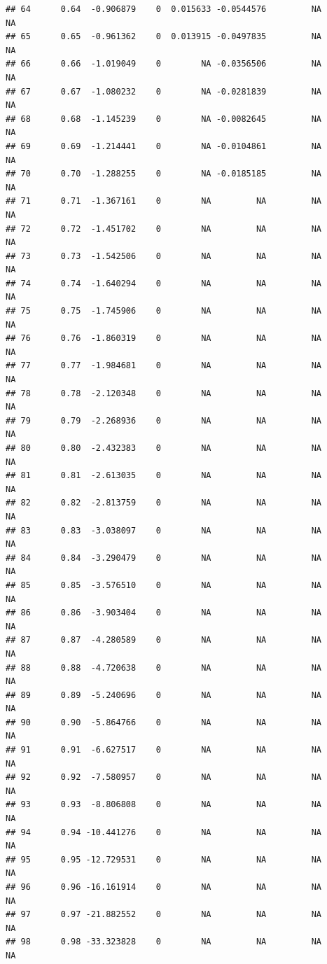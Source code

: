 \documentclass{article}\usepackage[]{graphicx}\usepackage[]{color}
\makeatletter
\newenvironment{kframe}{%
 \def\at@end@of@kframe{}%
 \ifinner\ifhmode%
  \def\at@end@of@kframe{\end{minipage}}%
  \begin{minipage}{\columnwidth}%
 \fi\fi%
 \def\FrameCommand##1{\hskip\@totalleftmargin \hskip-\fboxsep
 \colorbox{shadecolor}{##1}\hskip-\fboxsep
     \hskip-\linewidth \hskip-\@totalleftmargin \hskip\columnwidth}%
 \MakeFramed {\advance\hsize-\width
   \@totalleftmargin\z@ \linewidth\hsize
   \@setminipage}}%
 {\par\unskip\endMakeFramed%
 \at@end@of@kframe}
\newenvironment{knitrout}{}{} %
\makeatother
\begin{document}
\begin{knitrout}
\begin{kframe}
\begin{verbatim}
## 64      0.64  -0.906879    0  0.015633 -0.0544576         NA          NA
## 65      0.65  -0.961362    0  0.013915 -0.0497835         NA          NA
## 66      0.66  -1.019049    0        NA -0.0356506         NA          NA
## 67      0.67  -1.080232    0        NA -0.0281839         NA          NA
## 68      0.68  -1.145239    0        NA -0.0082645         NA          NA
## 69      0.69  -1.214441    0        NA -0.0104861         NA          NA
## 70      0.70  -1.288255    0        NA -0.0185185         NA          NA
## 71      0.71  -1.367161    0        NA         NA         NA          NA
## 72      0.72  -1.451702    0        NA         NA         NA          NA
## 73      0.73  -1.542506    0        NA         NA         NA          NA
## 74      0.74  -1.640294    0        NA         NA         NA          NA
## 75      0.75  -1.745906    0        NA         NA         NA          NA
## 76      0.76  -1.860319    0        NA         NA         NA          NA
## 77      0.77  -1.984681    0        NA         NA         NA          NA
## 78      0.78  -2.120348    0        NA         NA         NA          NA
## 79      0.79  -2.268936    0        NA         NA         NA          NA
## 80      0.80  -2.432383    0        NA         NA         NA          NA
## 81      0.81  -2.613035    0        NA         NA         NA          NA
## 82      0.82  -2.813759    0        NA         NA         NA          NA
## 83      0.83  -3.038097    0        NA         NA         NA          NA
## 84      0.84  -3.290479    0        NA         NA         NA          NA
## 85      0.85  -3.576510    0        NA         NA         NA          NA
## 86      0.86  -3.903404    0        NA         NA         NA          NA
## 87      0.87  -4.280589    0        NA         NA         NA          NA
## 88      0.88  -4.720638    0        NA         NA         NA          NA
## 89      0.89  -5.240696    0        NA         NA         NA          NA
## 90      0.90  -5.864766    0        NA         NA         NA          NA
## 91      0.91  -6.627517    0        NA         NA         NA          NA
## 92      0.92  -7.580957    0        NA         NA         NA          NA
## 93      0.93  -8.806808    0        NA         NA         NA          NA
## 94      0.94 -10.441276    0        NA         NA         NA          NA
## 95      0.95 -12.729531    0        NA         NA         NA          NA
## 96      0.96 -16.161914    0        NA         NA         NA          NA
## 97      0.97 -21.882552    0        NA         NA         NA          NA
## 98      0.98 -33.323828    0        NA         NA         NA          NA

\end{verbatim}
\end{kframe}
\end{knitrout}
\end{document}
